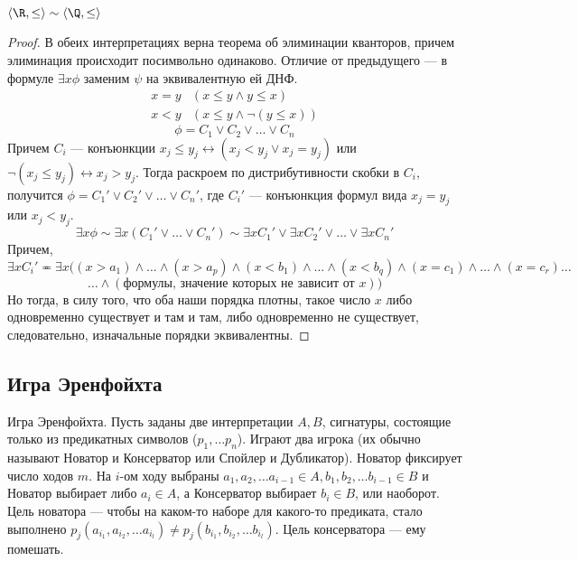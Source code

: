 \begin{theorem}
    $\langle \R, \le \rangle \sim \langle \Q, \le \rangle$
\end{theorem}
\begin{proof}
    В обеих интерпретациях верна теорема об элиминации кванторов, причем элиминация происходит посимвольно одинаково. Отличие от предыдущего --- в формуле $\exists x \phi$ заменим $\psi$ на эквивалентную ей ДНФ.
    $$\begin{array}{cc}
        x = y & (x \le y \wedge y \le x)  \\
        x < y & (x \le y \wedge \neg (y \le x))
    \end{array}$$
    $$\phi = C_1 \vee C_2 \vee \dots \vee C_n$$
    Причем $C_i$ --- конъюнкции $x_j \le y_j \leftrightarrow (x_j < y_j \vee x_j = y_j)$ или $\neg (x_j \le y_j) \leftrightarrow x_j > y_j$. Тогда раскроем по дистрибутивности скобки в $C_i$, получится $\phi = C_1' \vee C_2' \vee \dots \vee C_n'$, где $C_i'$ --- конъюнкция формул вида $x_j = y_j$ или $x_j < y_j$.
    $$\exists x \phi \sim \exists x (C_1' \vee \dots \vee C_n') \sim \exists x C_1' \vee \exists x C_2' \vee \dots \vee \exists x C_n'$$
    Причем,
    $$\exists x C_i' \eqcirc \exists x ((x > a_1) \wedge \dots \wedge (x > a_p) \wedge (x < b_1) \wedge \dots \wedge (x < b_q) \wedge (x = c_1) \wedge \dots \wedge (x = c_r) \dots$$
    $$\dots \wedge (\text{формулы, значение которых не зависит от $x$}))$$
    Но тогда, в силу того, что оба наши порядка плотны, такое число $x$ либо одновременно существует и там и там, либо одновременно не существует, следовательно, изначальные порядки эквивалентны.
\end{proof}

\subsection{Игра Эренфойхта}

\begin{definition}
    Игра Эренфойхта. Пусть заданы две интерпретации $A, B$, сигнатуры, состоящие только из предикатных символов ($p_1, \dots p_n$). Играют два игрока (их обычно называют Новатор и Консерватор или Спойлер и Дубликатор). Новатор фиксирует число ходов $m$. На $i$-ом ходу выбраны $a_1, a_2, \dots a_{i-1} \in A, b_1, b_2, \dots b_{i-1} \in B$ и Новатор выбирает либо $a_i \in A$, а Консерватор выбирает $b_i \in B$, или наоборот. Цель новатора --- чтобы на каком-то наборе для какого-то предиката, стало выполнено $p_j(a_{i_1}, a_{i_2}, \dots a_{i_l}) \ne p_j(b_{i_1}, b_{i_2}, \dots b_{i_l})$. Цель консерватора --- ему помешать.
\end{definition}

